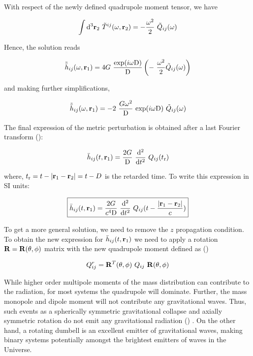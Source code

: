 \documentclass[epsf]{article}
\begin{document}
With respect of the newly defined quadrupole moment tensor, we have

\begin{equation}
\int {\rm d}^3 {\bf r}_2~\tilde{T}^{ij}(\omega, {\bf r}_2) = - \frac{\omega^2}{2}~
\tilde{Q}_{ij}(\omega)
\end{equation}

Hence, the solution reads

\begin{equation}
\tilde{\bar{h}}_{ij}(\omega, {\bf r}_1) = 4G~\frac{{\rm exp}(i\omega{\rm D})}
{{\rm D}}\left(-~\frac{\omega^2}{2}\tilde{Q}_{ij}(\omega)\right)
\end{equation}

and making further simplifications,

\begin{equation}
\tilde{\bar{h}}_{ij}(\omega, {\bf r}_1) = -2~\frac{G\omega^2}{{\rm D}}
~{\rm exp}(i\omega{\rm D})~\tilde{Q}_{ij}(\omega)
\end{equation}

The final expression of the metric perturbation is obtained after a last Fourier transform (\cite{chaky}):

\begin{equation}
\bar{h}_{ij}(t, {\bf r}_1) = \frac{2G}{{\rm D}}~\frac{{\rm d}^2}{{\rm d}t^2}~Q_{ij}(t_{{\rm r}})
\end{equation}

where, $t_{{\rm r}} = t - |{\bf r}_1 - {\bf r}_2|=t - D$ is the retarded time. To write this expression in SI units:

\begin{equation}
\boxed{\bar{h}_{ij}(t, {\bf r}_1) = \frac{2G}{c^4{\rm D}}~\frac{{\rm d}^2}{{\rm d}t^2}~Q_{ij}(t - \frac {|{\bf r}_1 - {\bf r}_2|}{c})}
\label{eqn:inertia}
\end{equation}

To get a more general solution, we need to remove the $z$ propagation condition. To obtain the new expression for 
$\bar{h}_{ij}(t, {\bf r}_1)$ we need to apply a rotation ${\rm \bf R}={\rm \bf R}(\theta, \phi)$ matrix with the new
quadrupole moment defined as (\cite{maggiore,ian})

\begin{equation}
Q_{ij}^r = {\rm \bf R}^T(\theta, \phi)~Q_{ij}~{\rm \bf R}(\theta, \phi)
\end{equation}

While higher order multipole moments of the mass distribution can contribute to the radiation, for most systems the quadrupole will dominate. Further, the mass monopole and dipole moment will not contribute any gravitational waves. Thus, such events as a spherically symmetric gravitational collapse and axially symmetric rotation do not emit any gravitational radiation (\cite{maggiore,cre}) . On the other hand, a rotating dumbell is an excellent emitter of gravitational waves, making binary systems potentially amongst the brightest emitters of waves in the Universe.
\end{document}
